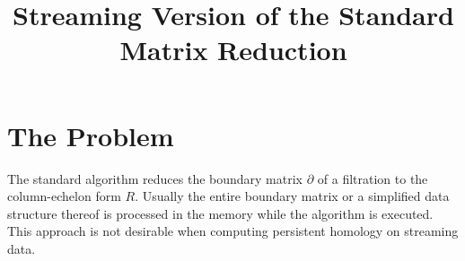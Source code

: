 \documentclass[11pt]{article}
\begin{document}
\title{Streaming Version of the Standard Matrix Reduction}

\maketitle

\section{The Problem}

The standard algorithm \cite{edelsbrunner-00, zomorodian-05} reduces the boundary matrix $\partial$ 
of a filtration to the column-echelon form $R$.  Usually the entire boundary matrix or a simplified 
data structure thereof is processed in the memory while the algorithm is executed.  This approach 
is not desirable when computing persistent homology on streaming data.



\end{document}
